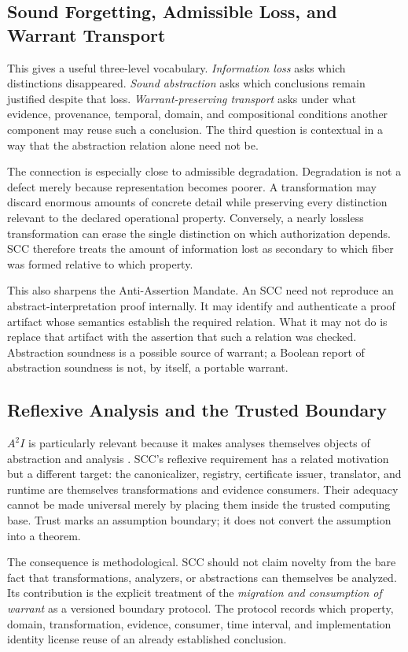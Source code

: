 \documentclass[11pt]{article}
\begin{document}
\subsection{Sound Forgetting, Admissible Loss, and Warrant Transport}
This gives a useful three-level vocabulary. \emph{Information loss} asks which distinctions disappeared. \emph{Sound abstraction} asks which conclusions remain justified despite that loss. \emph{Warrant-preserving transport} asks under what evidence, provenance, temporal, domain, and compositional conditions another component may reuse such a conclusion. The third question is contextual in a way that the abstraction relation alone need not be.

The connection is especially close to admissible degradation. Degradation is not a defect merely because representation becomes poorer. A transformation may discard enormous amounts of concrete detail while preserving every distinction relevant to the declared operational property. Conversely, a nearly lossless transformation can erase the single distinction on which authorization depends. SCC therefore treats the amount of information lost as secondary to which fiber was formed relative to which property.

This also sharpens the Anti-Assertion Mandate. An SCC need not reproduce an abstract-interpretation proof internally. It may identify and authenticate a proof artifact whose semantics establish the required relation. What it may not do is replace that artifact with the assertion that such a relation was checked. Abstraction soundness is a possible source of warrant; a Boolean report of abstraction soundness is not, by itself, a portable warrant.

\subsection{Reflexive Analysis and the Trusted Boundary}
$A^2I$ is particularly relevant because it makes analyses themselves objects of abstraction and analysis \cite{cousot2019a2i}. SCC's reflexive requirement has a related motivation but a different target: the canonicalizer, registry, certificate issuer, translator, and runtime are themselves transformations and evidence consumers. Their adequacy cannot be made universal merely by placing them inside the trusted computing base. Trust marks an assumption boundary; it does not convert the assumption into a theorem.

The consequence is methodological. SCC should not claim novelty from the bare fact that transformations, analyzers, or abstractions can themselves be analyzed. Its contribution is the explicit treatment of the \emph{migration and consumption of warrant} as a versioned boundary protocol. The protocol records which property, domain, transformation, evidence, consumer, time interval, and implementation identity license reuse of an already established conclusion.
\end{document}

